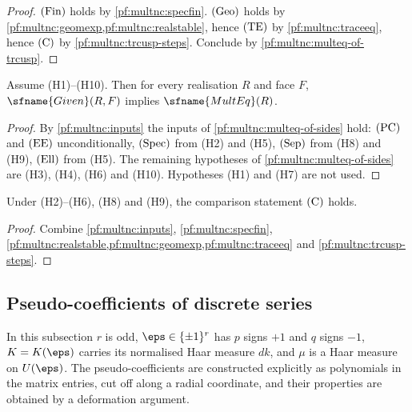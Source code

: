 \begin{proof}
$\textup{(Fin)}$ holds by \cref{pf:multnc:specfin}. $\textup{(Geo)}$ holds by \cref{pf:multnc:geomexp,pf:multnc:realstable},
hence $\textup{(TE)}$ by \cref{pf:multnc:traceeq}, hence $\textup{(C)}$ by \cref{pf:multnc:trcusp-steps}. Conclude by
\cref{pf:multnc:multeq-of-trcusp}.
\end{proof}

\begin{theorem}\label{pf:multnc:thm-assembly}
Assume (H1)--(H10). Then for every realisation $R$ and face $F$, $\sfname{Given}(R,F)$ implies $\sfname{MultEq}(R)$.
\end{theorem}

\begin{proof}
By \cref{pf:multnc:inputs} the inputs of \cref{pf:multnc:multeq-of-sides} hold: $\textup{(PC)}$ and $\textup{(EE)}$
unconditionally, $\textup{(Spec)}$ from (H2) and (H5), $\textup{(Sep)}$ from (H8) and (H9), $\textup{(Ell)}$ from (H5).
The remaining hypotheses of \cref{pf:multnc:multeq-of-sides} are (H3), (H4), (H6) and (H10). Hypotheses (H1) and (H7) are
not used.
\end{proof}

\begin{corollary}\label{pf:multnc:trcusp-holds}
Under (H2)--(H6), (H8) and (H9), the comparison statement $\textup{(C)}$ holds.
\end{corollary}

\begin{proof}
Combine \cref{pf:multnc:inputs}, \cref{pf:multnc:specfin}, \cref{pf:multnc:realstable,pf:multnc:geomexp,pf:multnc:traceeq}
and \cref{pf:multnc:trcusp-steps}.
\end{proof}


\subsection{Pseudo-coefficients of discrete series}\label{pf:multnc:sec-pc}

In this subsection $r$ is odd, $\eps\in\{\pm1\}^r$ has $p$ signs $+1$ and $q$ signs $-1$, $K=K(\eps)$ carries its
normalised Haar measure $dk$, and $\mu$ is a Haar measure on $U(\eps)$. The pseudo-coefficients are constructed explicitly
as polynomials in the matrix entries, cut off along a radial coordinate, and their properties are obtained by a deformation
argument.

